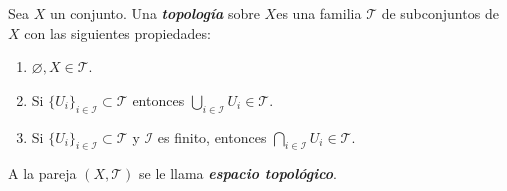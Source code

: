 

\begin{definition}
Sea $X$ un conjunto. Una \emph{\bfseries topología} sobre $X$es una familia $\mathcal{T}$ de subconjuntos de $X$ con las siguientes propiedades:
\begin{enumerate}[label=\textnormal{(\roman*)}]
\item $\varnothing, X \in \mathcal{T}$.
\item Si $\{ U_i \}_{i \in \mathcal{I}} \subset \mathcal{T}$ entonces $\bigcup_{i \in \mathcal{I}} U_i \in \mathcal{T}$.
\item Si $\{ U_i \}_{i \in \mathcal{I}} \subset \mathcal{T}$ y $\mathcal{I}$ es finito, entonces $\bigcap_{i \in \mathcal{I}} U_i \in \mathcal{T}$.
\end{enumerate}

A la pareja $(X,\mathcal{T})$ se le llama \emph{\bfseries espacio topológico}.
\end{definition}
